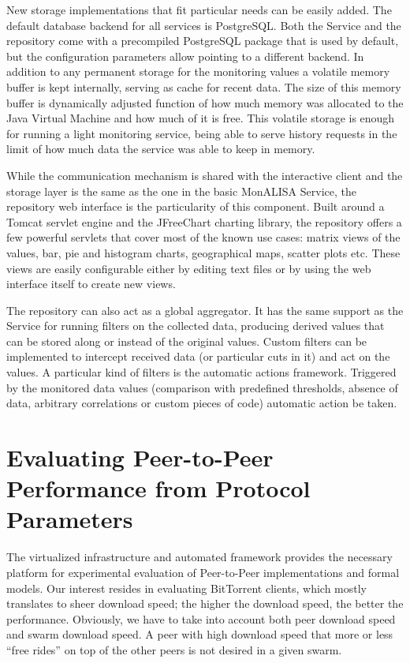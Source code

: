 New storage implementations that fit particular needs can be easily added. The
default database backend for all services is PostgreSQL. Both the Service and
the repository come with a precompiled PostgreSQL package that is used by
default, but the configuration parameters allow pointing to a different
backend. In addition to any permanent storage for the monitoring values a
volatile memory buffer is kept internally, serving as cache for recent data.
The size of this memory buffer is dynamically adjusted function of how much
memory was allocated to the Java Virtual Machine and how much of it is free.
This volatile storage is enough for running a light monitoring service, being
able to serve history requests in the limit of how much data the service was
able to keep in memory.

While the communication mechanism is shared with the interactive client and
the storage layer is the same as the one in the basic MonALISA Service, the
repository web interface is the particularity of this component. Built around
a Tomcat servlet engine and the JFreeChart charting library, the repository
offers a few powerful servlets that cover most of the known use cases: matrix
views of the values, bar, pie and histogram charts, geographical maps, scatter
plots etc. These views are easily configurable either by editing text files or
by using the web interface itself to create new views.

The repository can also act as a global aggregator. It has the same support as
the Service for running filters on the collected data, producing derived
values that can be stored along or instead of the original values. Custom
filters can be implemented to intercept received data (or particular cuts in
it) and act on the values. A particular kind of filters is the automatic
actions framework. Triggered by the monitored data values (comparison with
predefined thresholds, absence of data, arbitrary correlations or custom
pieces of code) automatic action be taken.

\section{Evaluating Peer-to-Peer Performance from Protocol Parameters}
\label{sec:proto-measure:eval-swarm}

The virtualized infrastructure and automated framework provides the necessary
platform for experimental evaluation of Peer-to-Peer implementations and
formal models. Our interest resides in evaluating BitTorrent clients, which
mostly translates to sheer download speed; the higher the download speed, the
better the performance. Obviously, we have to take into account both peer
download speed and swarm download speed. A peer with high download speed that
more or less ``free rides'' on top of the other peers is not desired in a
given swarm.

